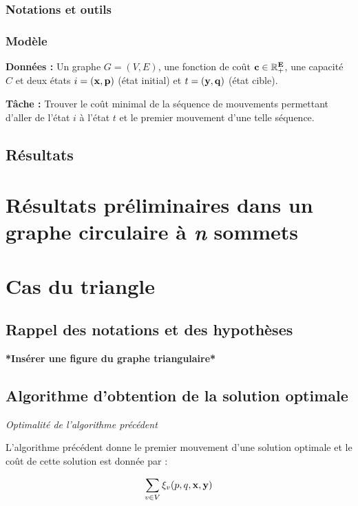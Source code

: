 \documentclass[twoside,10pt,openany,a4paper]{rapport}
\begin{document}
\subsection{Notations et outils}

\subsection{Modèle}

\textbf{Données :} Un graphe $G=(V,E)$, une fonction de coût $\bf{c} \in \mathbb{R}^E_+$, une capacité $C$ et deux états $i=(\bf{x},p)$ (état initial) et $t=(\bf{y},q)$ (état cible).

\textbf{Tâche :} Trouver le coût minimal de la séquence de mouvements permettant d'aller de l'état $i$ à l'état $t$ et le premier mouvement d'une telle séquence.

\section{Résultats}

\chapter{Résultats préliminaires dans un graphe circulaire à \emph{n} sommets}

\chapter{Cas du triangle}

\section{Rappel des notations et des hypothèses}

\textbf{*Insérer une figure du graphe triangulaire*}


\section{Algorithme d'obtention de la solution optimale}

\begin{thm}
\emph{Optimalité de l'algorithme précédent}

L'algorithme précédent donne le premier mouvement d'une solution optimale et le coût de cette solution est donnée par :

$$\sum_{v \in V}\xi_v(p,q,\bf{x},\bf{y})$$
\end{thm}
\end{document}
